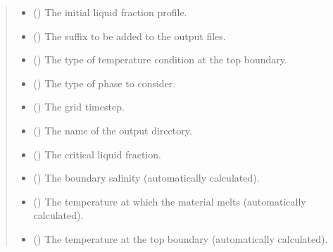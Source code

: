 \documentclass[a4paper,11pt,english,openany]{sphinxmanual}
\begin{document}
\begin{fulllineitems}
\begin{quote}
\begin{description}
\begin{itemize}
\item {} 
\sphinxAtStartPar
{} () \textendash{} The initial liquid fraction profile.

\item {} 
\sphinxAtStartPar
{} () \textendash{} The suffix to be added to the output files.

\item {} 
\sphinxAtStartPar
{} () \textendash{} The type of temperature condition at the top boundary.

\item {} 
\sphinxAtStartPar
{} () \textendash{} The type of phase to consider.

\item {} 
\sphinxAtStartPar
{} () \textendash{} The grid timestep.

\item {} 
\sphinxAtStartPar
{} () \textendash{} The name of the output directory.

\item {} 
\sphinxAtStartPar
{} () \textendash{} The critical liquid fraction.

\item {} 
\sphinxAtStartPar
{} () \textendash{} The boundary salinity (automatically calculated).

\item {} 
\sphinxAtStartPar
{} () \textendash{} The temperature at which the material melts (automatically calculated).

\item {} 
\sphinxAtStartPar
{} () \textendash{} The temperature at the top boundary (automatically calculated).


\end{itemize}
\end{description}
\end{quote}
\end{fulllineitems}
\end{document}
